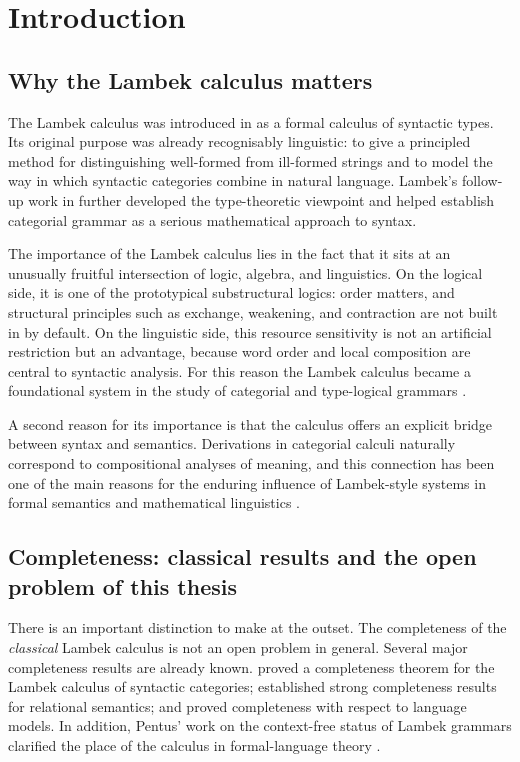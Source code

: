 \chapter{Introduction}

\section{Why the Lambek calculus matters}
The Lambek calculus was introduced in \citet{Lambek1958} as a formal calculus of syntactic
types. Its original purpose was already recognisably linguistic: to give a principled method for
distinguishing well-formed from ill-formed strings and to model the way in which syntactic
categories combine in natural language. Lambek's follow-up work in \citet{Lambek1961}
further developed the type-theoretic viewpoint and helped establish categorial grammar as a
serious mathematical approach to syntax.

The importance of the Lambek calculus lies in the fact that it sits at an unusually fruitful
intersection of logic, algebra, and linguistics. On the logical side, it is one of the prototypical
substructural logics: order matters, and structural principles such as exchange, weakening, and
contraction are not built in by default. On the linguistic side, this resource sensitivity is not an
artificial restriction but an advantage, because word order and local composition are central to
syntactic analysis. For this reason the Lambek calculus became a foundational system in the
study of categorial and type-logical grammars \citep{vanBenthem1988,Moortgat1995Multimodal,morrill1996generalising}.

A second reason for its importance is that the calculus offers an explicit bridge between syntax
and semantics. Derivations in categorial calculi naturally correspond to compositional analyses of
meaning, and this connection has been one of the main reasons for the enduring influence of
Lambek-style systems in formal semantics and mathematical linguistics \citep{vanBenthem1988,Steedman2000}.


\section{Completeness: classical results and the open problem of this thesis}
There is an important distinction to make at the outset. The completeness of the \emph{classical}
Lambek calculus is not an open problem in general. Several major completeness results are
already known. \citet{Dosen1985} proved a completeness theorem for the Lambek calculus of
syntactic categories; \citet{AndrekaMikulas1994} established strong completeness results for
relational semantics; and \citet{Pentus1995} proved completeness with respect to language
models. In addition, Pentus' work on the context-free status of Lambek grammars clarified the
place of the calculus in formal-language theory \citep{Pentus1993,Pentus1997}.

